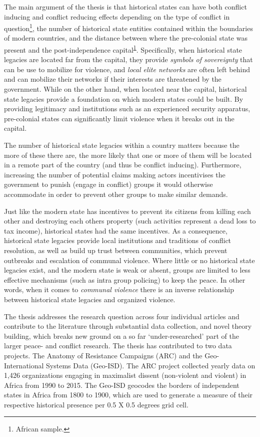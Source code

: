 \documentclass[12pt]{article}
\begin{document}
The main argument of the thesis is that historical states can have both conflict
inducing and conflict reducing effects depending on the type of conflict in
question\footnote{\label{note1}African sample.}, the number of historical state
entities contained within the boundaries of modern countries, and the distance
between where the pre-colonial state was present and the post-independence
capital\textsuperscript{\ref{note1}}. Specifically, when historical state
legacies are located far from the capital, they provide \textit{symbols of
sovereignty} that can be use to mobilize for violence, and \textit{local elite
networks} are often left behind and can mobilize their networks if their
interests are threatened by the government. While on the other hand, when
located near the capital, historical state legacies provide a foundation on
which modern states could be built. By providing legitimacy and institutions
such as an experienced security apparatus, pre-colonial states can significantly
limit violence when it breaks out in the capital.

The number of historical state legacies within a country matters because the
more of these there are, the more likely that one or more of them will be
located in a remote part of the country (and thus be conflict inducing).
Furthermore, increasing the number of potential claims making actors
incentivises the government to punish (engage in conflict) groups it would
otherwise accommodate in order to prevent other groups to make similar demands.

Just like the modern state has incentives to prevent its citizens from killing
each other and destroying each others property (such activities represent a dead
loss to tax income), historical states had the same incentives. As a
consequence, historical state legacies provide local institutions and traditions
of conflict resolution, as well as build up trust between communities, which
prevent outbreaks and escalation of communal violence. Where little or no
historical state legacies exist, and the modern state is weak or absent, groups
are limited to less effective mechanisms (such as intra group policing) to keep
the peace. In other words, when it comes to \textit{communal violence} there is
an inverse relationship between historical state legacies and organized
violence.

The thesis addresses the research question across four individual articles and
contribute to the literature through substantial data collection, and novel
theory building, which breaks new ground on a so far `under-researched' part of
the larger peace- and conflict research. The thesis has contributed to two data
projects. The Anatomy of Resistance Campaigns (ARC) and the Geo-International
Systems Data (Geo-ISD). The ARC project collected yearly data on 1,426 organizations
engaging in maximalist dissent (non-violent and violent) in Africa from 1990 to
2015. The Geo-ISD geocodes the borders of independent states in Africa from
1800 to 1900, which are used to generate a measure of their respective
historical presence per 0.5 X 0.5 degrees grid cell. 
\end{document}
